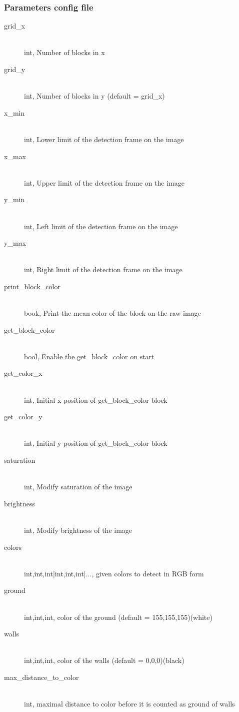     \subsubsection{Parameters config file}
        \begin{description}
            \item[grid\_x] \hfill \\ int, Number of blocks in x
            \item[grid\_y] \hfill \\ int,  Number of blocks in y 
                (default = grid\_x)
            \item[x\_min] \hfill \\ int, Lower limit of the detection 
                frame on the image
            \item[x\_max] \hfill \\ int, Upper limit of the detection 
                frame on the image
            \item[y\_min] \hfill \\ int, Left limit of the detection frame 
                on the image
            \item[y\_max] \hfill \\ int, Right limit of the detection 
                frame on the image
            \item[print\_block\_color] \hfill \\ book, Print the mean 
                color of the block on the raw image
            \item[get\_block\_color] \hfill \\ bool, Enable the 
                get\_block\_color on start
            \item[get\_color\_x] \hfill \\ int,  Initial x position of 
                get\_block\_color block
            \item[get\_color\_y] \hfill \\ int,  Initial y position of 
                get\_block\_color block
            \item[saturation] \hfill \\ int,  Modify saturation of the 
                image
            \item[brightness] \hfill \\ int,  Modify brightness of the 
                image
            \item[colors] \hfill \\ int,int,int|int,int,int|..., given 
                colors to detect in RGB form
            \item[ground] \hfill \\ int,int,int, color of the ground 
                (default = 155,155,155)(white)
            \item[walls] \hfill \\ int,int,int, color of the walls 
                (default = 0,0,0)(black)
            \item[max\_distance\_to\_color] \hfill \\ int, maximal 
                distance to color before it is counted as ground of walls
        \end{description}

